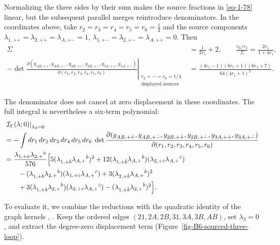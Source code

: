 \documentclass[11pt]{article}
\numberwithin{equation}{section}
\numberwithin{figure}{section}
\numberwithin{table}{section}
\begin{document}
Normalizing the three sides by their sum makes the source fractions in \eqref{eq-1-78} linear, but the subsequent parallel merges reintroduce denominators. In the coordinates above, take $r_2=r_3=r_4=r_5=r_6=\tfrac14$ and the source components $\lambda_{1,+\dot+}=\lambda_{2,+\dot+}=\lambda_{A,+\dot-}=1$, $\lambda_{1,+\dot-}=\lambda_{2,+\dot-}=\lambda_{A,+\dot+}=0$. Then
{\footnotesize
\begin{equation*}
\begin{aligned}
\Sigma&=\frac1{2r_1}+2,\qquad
\frac{r_6/r_3}{\Sigma}=\frac{2r_1}{1+4r_1},\\
-\left.\det\frac{\partial(y_{AB,+\dot+},y_{AB,+\dot-},y_{2B,+\dot+},y_{2B,+\dot-},y_{3A,+\dot+},y_{3A,+\dot-})}{\partial(r_1,r_2,r_3,r_4,r_5,r_6)}\right|_{\substack{r_2=\cdots=r_6=1/4\\\text{displayed sources}}}
&=\frac{(4r_1-1)(6r_1+1)(6r_1+7)}{64(4r_1+1)^2}.
\end{aligned}
\end{equation*}
}

The denominator does not cancel at zero displacement in these coordinates. The full integral is nevertheless a six-term polynomial:
\begin{equation}\label{eq-1-81}
\begin{aligned}
&\left.\mathcal I_\Gamma(\lambda;0)\right|_{\lambda_3=0}\\
&=-\int dr_1\,dr_2\,dr_3\,dr_4\,dr_5\,dr_6\;
\det\frac{\partial(y_{AB,+\dot+},y_{AB,+\dot-},y_{2B,+\dot+},y_{2B,+\dot-},y_{3A,+\dot+},y_{3A,+\dot-})}{\partial(r_1,r_2,r_3,r_4,r_5,r_6)}\\
&=\frac{\lambda_{1,+\dot a}\lambda_{2,+}{}^{\dot a}}{576}
\Bigl[
5(\lambda_{1,+\dot b}\lambda_{A,+}{}^{\dot b})^2
+12(\lambda_{1,+\dot b}\lambda_{A,+}{}^{\dot b})(\lambda_{2,+\dot c}\lambda_{A,+}{}^{\dot c})\\
&\qquad-(\lambda_{1,+\dot b}\lambda_{2,+}{}^{\dot b})(\lambda_{1,+\dot c}\lambda_{A,+}{}^{\dot c})
+3(\lambda_{2,+\dot b}\lambda_{A,+}{}^{\dot b})^2\\
&\qquad+3(\lambda_{1,+\dot b}\lambda_{2,+}{}^{\dot b})(\lambda_{2,+\dot c}\lambda_{A,+}{}^{\dot c})
-(\lambda_{1,+\dot b}\lambda_{2,+}{}^{\dot b})^2
\Bigr].
\end{aligned}
\end{equation}

To evaluate it, we combine the reductions with the quadratic identity of the graph kernels \cite[Section 3.2]{operatope}, \cite[Theorem 7]{Wang}. Keep the ordered edges $(21,2A,2B,31,3A,3B,AB)$, set $\lambda_3=0$, and extract the degree-zero displacement term (Figure~\ref{fig-B6-sourced-three-loop}).
\end{document}
